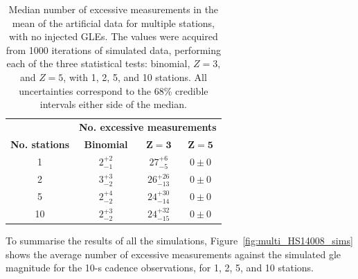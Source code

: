 \begin{table}[ht!]
	\begin{center}
		\caption{Median number of excessive measurements in the mean of the artificial data for multiple stations, with no injected GLEs. The values were acquired from 1000 iterations of simulated data, performing each of the three statistical tests: binomial, $Z=3$, and $Z=5$, with 1, 2, 5, and 10 stations. All uncertainties correspond to the 68\% credible intervals either side of the median.}
		\label{tab:HS_14008_multi_sims_zeros}
		\begin{tabular}{c c c c}
			\hline 
			{} & \multicolumn{3}{c}{\bf No. excessive measurements} \\ 
			{\bf No. stations} & {\bf Binomial} & {\bf $\mathbf{Z=3}$} & {\bf $\mathbf{Z=5}$}  \\ 
			\hline 
			1 & $ 2^{+2}_{-1} $ & $ 27^{+6}_{-5} $ & $ 0 \pm 0 $ \\ 
			2 & $ 3^{+3}_{-2} $ & $ 26^{+26}_{-13} $ & $ 0 \pm 0 $ \\ 
			5 & $ 2^{+4}_{-2} $ & $ 24^{+30}_{-14} $ & $ 0 \pm 0 $ \\ 
			10 & $ 2^{+3}_{-2} $ & $ 24^{+32}_{-15} $ & $ 0 \pm 0 $ \\ 
			\hline 
		\end{tabular} 
	\end{center}
\end{table}
%
%

To summarise the results of all the simulations, Figure~\ref{fig:multi_HS14008_sims} shows the average number of excessive measurements against the simulated \gls{gle} magnitude for the 10-s cadence observations, for 1, 2, 5, and 10 stations. %



